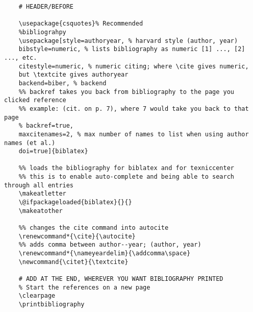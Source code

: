 \begin{lstlisting}
	# HEADER/BEFORE 

	\usepackage{csquotes}% Recommended
	%bibliograhpy
	\usepackage[style=authoryear, % harvard style (author, year)
	bibstyle=numeric, % lists bibliography as numeric [1] ..., [2] ..., etc.
	citestyle=numeric, % numeric citing; where \cite gives numeric, 
	but \textcite gives authoryear
	backend=biber, % backend
	%% backref takes you back from bibliography to the page you clicked reference
	%% example: (cit. on p. 7), where 7 would take you back to that page
	% backref=true,  
	maxcitenames=2, % max number of names to list when using author names (et al.)
	doi=true]{biblatex}
	
	%% loads the bibliography for biblatex and for texniccenter
	%% this is to enable auto-complete and being able to search through all entries
	\makeatletter
	\@ifpackageloaded{biblatex}{}{}
	\makeatother
	
	%% changes the cite command into autocite
	\renewcommand*{\cite}{\autocite}
	%% adds comma between author--year; (author, year)
	\renewcommand*{\nameyeardelim}{\addcomma\space}
	\newcommand{\citet}{\textcite}
	
	# ADD AT THE END, WHEREVER YOU WANT BIBLIOGRAPHY PRINTED
	% Start the references on a new page
	\clearpage
	\printbibliography
\end{lstlisting}

